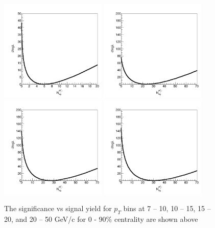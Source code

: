 \begin{figure}[h]
\begin{center}
\includegraphics[width= 0.45\textwidth]{Figures/Chapter4/sigscan_0_90_7_10.png}
\includegraphics[width= 0.45\textwidth]{Figures/Chapter4/sigscan_0_90_10_15.png}
\includegraphics[width= 0.45\textwidth]{Figures/Chapter4/sigscan_0_90_15_20.png}
\includegraphics[width= 0.45\textwidth]{Figures/Chapter4/sigscan_0_90_20_50.png}
\caption{The significance vs signal yield for $p_T$ bins at 7 -- 10, 10 -- 15, 15 -- 20, and 20 -- 50 GeV/c for 0 - 90\% centrality are shown above}
\label{BsSigScan}
\end{center}
\end{figure}


